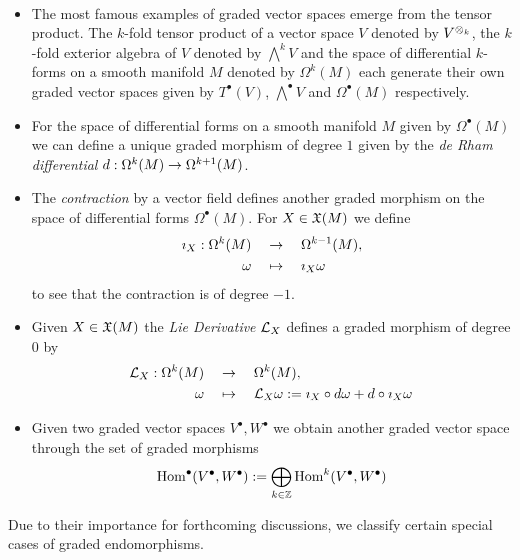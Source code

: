 \begin{example}~
  \begin{itemize}
    \item The most famous examples of graded vector spaces emerge from the tensor product. The $k$-fold tensor product of a vector space $V$ denoted by $V^{\mathbin{\mathop{\otimes}\displaylimits_{k}}}$, the $k$-fold exterior algebra of $V$ denoted by $\bigwedge^k V$ and the space of differential $k$-forms on a smooth manifold $M$ denoted by $\Omega^k(M)$ each generate their own graded vector spaces given by $T^\bullet(V)$, $\bigwedge^\bullet V$ and $\Omega^\bullet(M)$ respectively.

    \item For the space of differential forms on a smooth manifold $M$ given by $\Omega^\bullet(M)$ we can define a unique graded morphism of degree $1$ given by the \emph{de Rham differential} $d: \Omega^k(M) \rightarrow \Omega^{k+1}(M)$.

    \item The \emph{contraction} by a vector field defines another graded morphism on the space of differential forms $\Omega^\bullet(M)$. For $X \in \mathfrak{X}(M)$ we define
     \begin{align*}
       \imath_X : \Omega^k(M)\quad &\rightarrow \quad\Omega^{k-1}(M),\\
       \omega\quad  &\mapsto \quad \imath_X\omega
     \end{align*}
    to see that the contraction is of degree $-1$.

    \item Given $X \in \mathfrak{X}(M)$ the \emph{Lie Derivative} $\mathcal{L}_{X}$ defines a graded morphism of degree $0$ by
      \begin{align*}
        \mathcal{L}_{X} : \Omega^k(M)\quad &\rightarrow \quad\Omega^{k}(M),\\
        \omega\quad  &\mapsto \quad \mathcal{L}_{X}\omega := \imath_X \circ d\omega + d \circ \imath_X\omega
      \end{align*}

    \item Given two graded vector spaces $V^\bullet, W^\bullet$ we obtain another graded vector space through the set of graded morphisms
    $$ \operatorname{Hom}^\bullet(V^\bullet, W^\bullet) := \bigoplus_{k\in\mathbb{Z}} \operatorname{Hom}^k(V^\bullet, W^\bullet) $$
  \end{itemize}
\end{example}

Due to their importance for forthcoming discussions, we classify certain special cases of graded endomorphisms.

